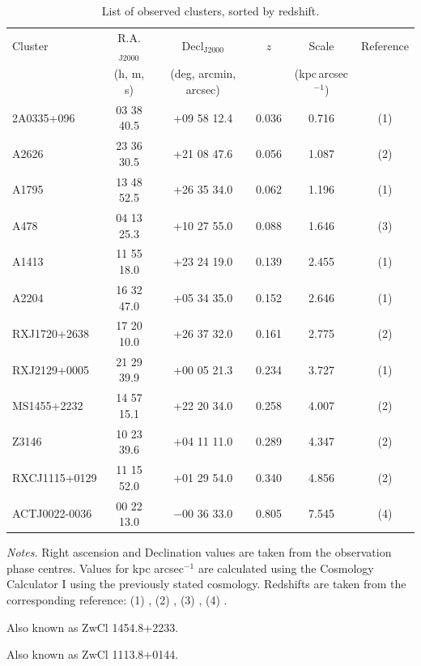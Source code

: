 \begin{table}[h]
    \centering
    \begin{threeparttable}
        \caption{List of observed clusters, sorted by redshift.}
        \label{tab:cluster_list}
        \begin{tabular}{lccccc}
            \toprule
            Cluster & R.A.$_{\text{J2000}}$ & Decl$_{\text{J2000}}$ & $z$ & Scale & Reference \\
            & (h, m, s) & \multicolumn{1}{c}{(deg, arcmin, arcsec)} & & (kpc\,arcsec$^{-1}$) \\
            \midrule
            2A0335+096 & 03 38 40.5 & +09 58 12.4 & 0.036 & 0.716 & (1) \\
            A2626 & 23 36 30.5 & +21 08 47.6 & 0.056 & 1.087 & (2) \\
            A1795 & 13 48 52.5 & +26 35 34.0 & 0.062 & 1.196 & (1) \\
            A478 & 04 13 25.3 & +10 27 55.0 & 0.088 & 1.646 & (3) \\
            A1413 & 11 55 18.0 & +23 24 19.0 & 0.139 & 2.455 & (1) \\
            A2204 & 16 32 47.0 & +05 34 35.0 & 0.152 & 2.646 & (1) \\
            RXJ1720+2638 & 17 20 10.0 & +26 37 32.0 & 0.161 & 2.775 & (2) \\
            RXJ2129+0005 & 21 29 39.9 & +00 05 21.3 & 0.234 & 3.727 & (1) \\
            MS1455+2232\tnote{a} & 14 57 15.1 & +22 20 34.0 & 0.258 & 4.007 & (2) \\
            Z3146 & 10 23 39.6 & +04 11 11.0 & 0.289 & 4.347 & (2) \\
            RXCJ1115+0129\tnote{b} & 11 15 52.0 & +01 29 54.0 & 0.340 & 4.856 & (2) \\
            ACTJ0022-0036 & 00 22 13.0 & $-$00 36 33.0 & 0.805 & 7.545 & (4) \\
            \bottomrule
        \end{tabular}
        
        \begin{tablenotes}[flushleft]
            \footnotesize
            \item \textit{Notes.} Right ascension and Declination values are taken from the observation phase centres. Values for kpc arcsec$^{-1}$ are calculated using the Cosmology Calculator I \citep{Wright2006} using the previously stated cosmology. Redshifts are taken from the corresponding reference: (1) \citet{Sanders2011}, (2) \citet{Wen2015}, (3) \citet{Liu2024}, (4) \citet{Menanteau2013}.
            \item[a] Also known as ZwCl 1454.8+2233.
            \item[b] Also known as ZwCl 1113.8+0144.
        \end{tablenotes}
    \end{threeparttable}
\end{table}

